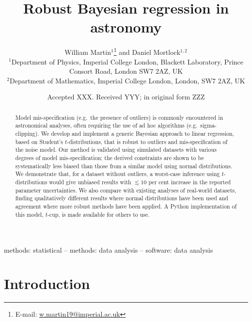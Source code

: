 \documentclass[fleqn,usenatbib]{rasti}
\title[Robust regression in astronomy]{Robust Bayesian regression in astronomy}
\author[W. Martin \& D. Mortlock]{
William Martin$^{1}$\thanks{E-mail: \href{mailto:w.martin19@imperial.ac.uk}{w.martin19@imperial.ac.uk}}
and Daniel Mortlock$^{1,2}$
\\
$^{1}$Department of Physics, Imperial College London, Blackett Laboratory, Prince Consort Road, London SW7 2AZ, UK\\
$^{2}$Department of Mathematics, Imperial College London, London, SW7 2AZ, UK
}
\date{Accepted XXX. Received YYY; in original form ZZZ}
\begin{document}
\label{firstpage}
\pagerange{\pageref{firstpage}--\pageref{lastpage}}
\maketitle

\begin{abstract}
Model mis-specification (e.g.\ the presence of outliers) is commonly encountered
in astronomical analyses, often requiring the use of ad hoc algorithms (e.g.\
sigma-clipping). We develop and implement a generic Bayesian approach to linear
regression, based on Student's $t$-distributions, that is robust to outliers and
mis-specification of the noise model. Our method is validated using simulated
datasets with various degrees of model mis-specification; the derived
constraints are shown to be systematically less biased than those from a similar
model using normal distributions. We demonstrate that, for a dataset without
outliers, a worst-case inference using $t$-distributions would give unbiased
results with $\lesssim\!\!10$ per cent increase in the reported parameter
uncertainties. We also compare with existing analyses of real-world datasets,
finding qualitatively different results where normal distributions have been
used and agreement where more robust methods have been applied. A Python
implementation of this model, $t$-cup, is made available for others to use.
\end{abstract}

\begin{keywords}
methods: statistical -- methods: data analysis -- software: data analysis
\end{keywords}



\section{Introduction}
\label{sec:intro}




\end{document}
